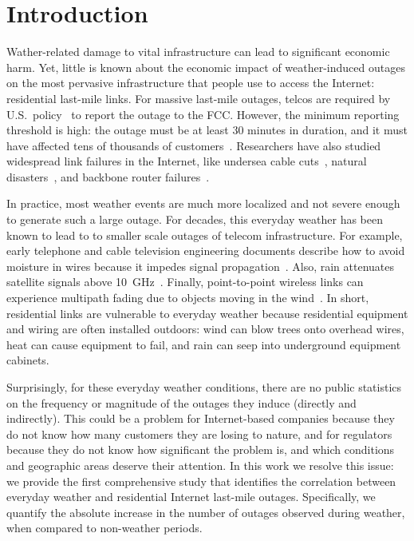 \section{Introduction}

Wather-related damage to vital infrastructure
can lead to significant economic harm.
%
Yet, %
little is known about the economic impact of
weather-induced outages on the most pervasive infrastructure that people use to
access the Internet: residential last-mile links.
%
For massive last-mile outages, telcos are required by U.S.~policy~\cite{cfr49}
to report the outage to the FCC.
%
However, the minimum reporting threshold is high: the outage must be at
least 30 minutes in duration, and it must have affected tens of thousands of
customers~\cite{cfr49}.
%
Researchers have also studied widespread link failures in the Internet,
like undersea cable cuts~\cite{chan-pam11, bilski-ccis09}, natural
disasters~\cite{heidemann-sandy}, and backbone router
failures~\cite{iannaccone-imw02}. 

In practice, most weather events are much more localized and not severe enough
to generate such a large outage.
%
For decades, this everyday weather has been known to lead to to smaller scale
outages of telecom infrastructure.
%
For example, early telephone and cable television engineering documents
describe how to avoid moisture in wires because it impedes signal
propagation~\cite{aiee09-jewett, toct66-smith}.  Also, rain attenuates
satellite signals above 10~GHz~\cite{ieee75-hogg}.  Finally, point-to-point
wireless links can experience multipath fading due to objects moving in the
wind~\cite{ieeecm01-bolcskei}. In short, residential links are vulnerable to
everyday weather because residential equipment and wiring are often installed
outdoors: wind can blow trees onto overhead wires, heat can cause equipment to
fail, and rain can seep into underground equipment cabinets.
 
Surprisingly, for these everyday weather conditions, there are no public
statistics on the frequency or magnitude of the outages they induce (directly
and indirectly).
%
This could be a problem for Internet-based companies because they do not know
how many customers they are losing to nature, and for regulators because they
do not know how significant the problem is, and which conditions and geographic
areas deserve their attention.
%
In this work we resolve this issue: we provide the first comprehensive study
that identifies the correlation between everyday weather and residential
Internet last-mile outages.
%
Specifically, we quantify the absolute increase in the number of outages
observed during weather, when compared to non-weather periods.

